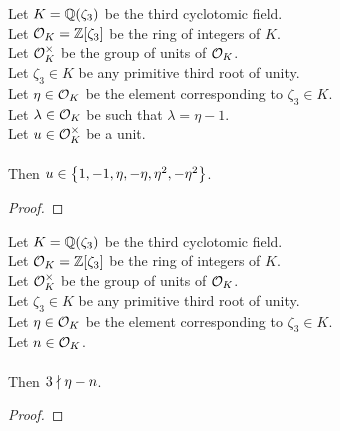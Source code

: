 \begin{theorem}
    \label{thm:mem}
    \leanok
    Let $K = \mathbb{Q}(\zeta_3)$ be the third cyclotomic field. \\
    Let $\mathcal{O}_K = \mathbb{Z}[\zeta_3]$ be the ring of integers of $K$. \\
    Let $\mathcal{O}^\times_K$ be the group of units of $\mathcal{O}_K$. \\
    Let $\zeta_3 \in K$ be any primitive third root of unity. \\
    Let $\eta \in \mathcal{O}_K$ be the element corresponding to $\zeta_3 \in K$. \\
    Let $\lambda \in \mathcal{O}_K$ be such that $\lambda = \eta -1$. \\
    Let $u \in \mathcal{O}^\times_K$ be a unit. \\\\
    Then $u \in \left\{1, -1, \eta, -\eta, \eta^2, -\eta^2\right\}$.
\end{theorem}
\begin{proof}
    \leanok
\end{proof}

\begin{theorem}
    \label{thm:not_exists_int_three_dvd_sub}
    \leanok
    Let $K = \mathbb{Q}(\zeta_3)$ be the third cyclotomic field. \\
    Let $\mathcal{O}_K = \mathbb{Z}[\zeta_3]$ be the ring of integers of $K$. \\
    Let $\mathcal{O}^\times_K$ be the group of units of $\mathcal{O}_K$. \\
    Let $\zeta_3 \in K$ be any primitive third root of unity. \\
    Let $\eta \in \mathcal{O}_K$ be the element corresponding to $\zeta_3 \in K$. \\
    Let $n \in \mathcal{O}_K$. \\\\
    Then $3 \nmid \eta - n$.
\end{theorem}
\begin{proof}
    \leanok
\end{proof}

